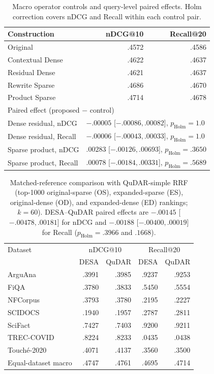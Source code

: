 \begin{table}[H]
\centering
\scriptsize
\setlength{\tabcolsep}{2.8pt}
\begin{tabular}{@{}lrr@{}}
\toprule
Construction & nDCG@10 & Recall@20 \\
\midrule
Original          & .4572 & .4586 \\
Contextual Dense  & .4622 & .4637 \\
Residual Dense    & .4621 & .4637 \\
Rewrite Sparse    & .4686 & .4670 \\
Product Sparse    & .4714 & .4678 \\
\midrule
\multicolumn{3}{l}{Paired effect (proposed $-$ control)} \\
Dense residual, nDCG   & \multicolumn{2}{l}{$-.00005$ [$-.00086,.00082$], $p_{\mathrm{Holm}}=1.0$} \\
Dense residual, Recall & \multicolumn{2}{l}{$-.00006$ [$-.00043,.00033$], $p_{\mathrm{Holm}}=1.0$} \\
Sparse product, nDCG   & \multicolumn{2}{l}{$ .00283$ [$-.00126,.00693$], $p_{\mathrm{Holm}}=.3650$} \\
Sparse product, Recall & \multicolumn{2}{l}{$ .00078$ [$-.00184,.00331$], $p_{\mathrm{Holm}}=.5689$} \\
\bottomrule
\end{tabular}
\caption{Macro operator controls and query-level paired effects. Holm
correction covers nDCG and Recall within each control pair.}
\label{tab:operator-controls}
\end{table}

\begin{table}[H]
\centering
\scriptsize
\setlength{\tabcolsep}{2.9pt}
\begin{tabular}{lrrrr}
\toprule
Dataset & \multicolumn{2}{c}{nDCG@10} & \multicolumn{2}{c}{Recall@20} \\
 & DESA & QuDAR & DESA & QuDAR \\
\midrule
ArguAna        & .3991 & .3985 & .9237 & .9253 \\
FiQA           & .3780 & .3833 & .5450 & .5554 \\
NFCorpus       & .3793 & .3780 & .2195 & .2227 \\
SCIDOCS        & .1940 & .1957 & .2787 & .2811 \\
SciFact        & .7427 & .7403 & .9200 & .9211 \\
TREC-COVID     & .8224 & .8233 & .0435 & .0438 \\
Touch\'e-2020 & .4071 & .4137 & .3560 & .3500 \\
\midrule
Equal-dataset macro & .4747 & .4761 & .4695 & .4714 \\
\bottomrule
\end{tabular}
\caption{Matched-reference comparison with QuDAR-simple RRF (top-1000
original-sparse (OS), expanded-sparse (ES), original-dense (OD), and
expanded-dense (ED) rankings; $k=60$). DESA--QuDAR paired effects are $-.00145$
[$-.00478,.00181$] for nDCG and $-.00188$ [$-.00400,.00019$] for Recall
($p_{\mathrm{Holm}}=.3966$ and $.1668$).}
\label{tab:qudar-matched}
\end{table}
